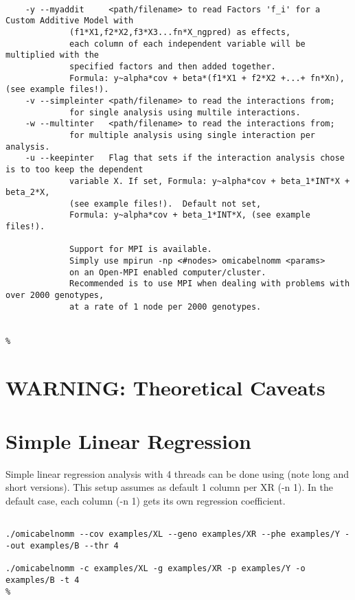 \documentclass{report}
\begin{document}
\pagebreak
\begin{lstlisting}[style=BASH,escapechar=\%]

	-y --myaddit  	 <path/filename> to read Factors 'f_i' for a Custom Additive Model with
			 (f1*X1,f2*X2,f3*X3...fn*X_ngpred) as effects,
			 each column of each independent variable will be multiplied with the 
			 specified factors and then added together. 
			 Formula: y~alpha*cov + beta*(f1*X1 + f2*X2 +...+ fn*Xn), (see example files!).
	-v --simpleinter <path/filename> to read the interactions from;
			 for single analysis using multile interactions. 
	-w --multinter 	 <path/filename> to read the interactions from;
			 for multiple analysis using single interaction per analysis. 
	-u --keepinter 	 Flag that sets if the interaction analysis chose is to too keep the dependent 
			 variable X. If set, Formula: y~alpha*cov + beta_1*INT*X + beta_2*X, 
			 (see example files!).  Default not set, 
			 Formula: y~alpha*cov + beta_1*INT*X, (see example files!). 

			 Support for MPI is available. 
			 Simply use mpirun -np <#nodes> omicabelnomm <params> 
			 on an Open-MPI enabled computer/cluster.
			 Recommended is to use MPI when dealing with problems with over 2000 genotypes,
			 at a rate of 1 node per 2000 genotypes.
	

%
\end{lstlisting}

\section{WARNING: Theoretical Caveats}

\section{Simple Linear Regression}

Simple linear regression analysis with 4 threads can be done using (note long and short versions).
This setup assumes as default 1 column per XR (-n 1). In the default case, each column (-n 1) gets its own regression coefficient.
\begin{lstlisting}[style=BASH,escapechar=\%]

./omicabelnomm --cov examples/XL --geno examples/XR --phe examples/Y --out examples/B --thr 4

./omicabelnomm -c examples/XL -g examples/XR -p examples/Y -o examples/B -t 4
%
\end{lstlisting}
\end{document}
